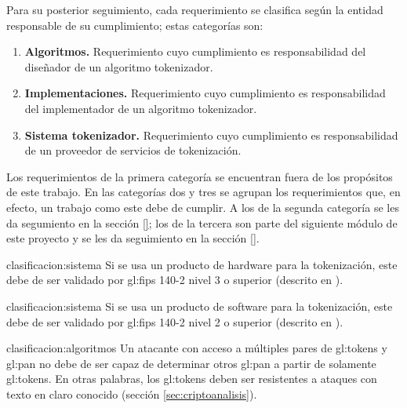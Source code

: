 Para su posterior seguimiento, cada requerimiento se clasifica según la
entidad responsable de su cumplimiento; estas categorías son:

\begin{enumerate}

  \item \textbf{\hypertarget{clasificacion:algoritmos}{Algoritmos}.}
    Requerimiento cuyo cumplimiento es responsabilidad del diseñador de un
    algoritmo tokenizador.

  \item \textbf{\hypertarget{clasificacion:implementaciones}{Implementaciones}.}
    Requerimiento cuyo cumplimiento es responsabilidad del implementador de un
    algoritmo tokenizador.

  \item \textbf{\hypertarget{clasificacion:sistema}{Sistema tokenizador}.}
    Requerimiento cuyo cumplimiento es responsabilidad de un proveedor de
    servicios de tokenización.

\end{enumerate}

Los requerimientos de la primera categoría se encuentran fuera de los
propósitos de este trabajo. En las categorías dos y tres se agrupan
los requerimientos que, en efecto, un trabajo como este debe de cumplir.
A los de la segunda categoría se les da segumiento en la sección \ref{};
los de la tercera son parte del siguiente módulo de este proyecto y se les
da seguimiento en la sección \ref{}.

{clasificacion:sistema}
{
  Si se usa un producto de hardware para la tokenización, este debe de ser
  validado por \gls{gl:fips} 140-2 nivel 3 o superior (descrito en
  \cite{nist_modulos_criptograficos}).
}

{clasificacion:sistema}
{
  Si se usa un producto de software para la tokenización, este debe de ser
  validado por \gls{gl:fips} 140-2 nivel 2 o superior (descrito en
  \cite{nist_modulos_criptograficos}).
}

{clasificacion:algoritmos}
{
  Un atacante con acceso a múltiples pares de \glspl{gl:token} y
  \gls{gl:pan} no debe de ser capaz de determinar otros \gls{gl:pan} a partir
  de solamente \glspl{gl:token}. En otras palabras, los \glspl{gl:token}
  deben ser resistentes a ataques con texto en claro conocido (sección
  \ref{sec:criptoanalisis}).
}

